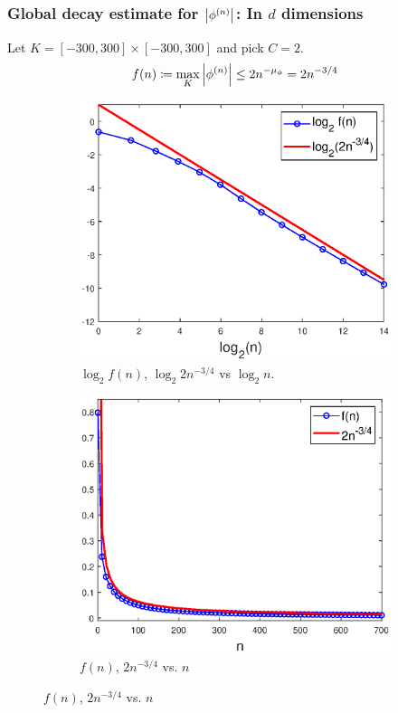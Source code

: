 \documentclass{beamer}
\theoremstyle{definition}
\begin{document}
\begin{frame}
\frametitle{Global decay estimate for $\abs{\phi^{(n)}}$: In $d$ dimensions}

Let $K = [-300,300]\times[-300,300]$ and pick $C=2$.  
\begin{equation*}
f(n)\coloneqq\max_{K}\abs{\phi^{(n)}}\leq 2n^{-\mu_\phi}= 2n^{-3/4}
\end{equation*}

\begin{figure}[!htb]
	\vspace{-10pt}
	\begin{subfigure}{0.49\textwidth}
		\centering
		\includegraphics[width=\textwidth]{Fig7a.eps}
		\caption{$\log_2 f(n)$, $\log_2 2n^{-3/4}$ vs $\log_2 n$.}
	\end{subfigure}
	\begin{subfigure}{0.49\textwidth}
		\centering
		\includegraphics[width=\textwidth]{Fig7b.eps}
		\caption{$f(n)$, $2n^{-3/4}$ vs. $n$}
	\end{subfigure}
	\label{fig:Conv_Pwr_2}
\end{figure}

\end{frame}
\end{document}
